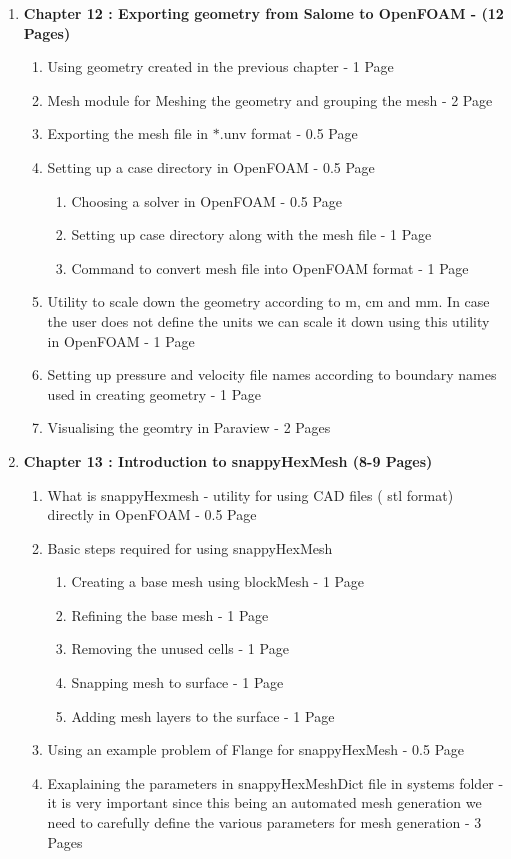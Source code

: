\documentclass[12pt]{article}
\begin{document}
\begin{enumerate}
\item \textbf{Chapter 12 : Exporting geometry from Salome to OpenFOAM - (12 Pages)}
\begin{enumerate}[label*=\arabic*.]
\item Using geometry created in the previous chapter - 1 Page 
\item Mesh module for Meshing the geometry and grouping the mesh - 2 Page
\item Exporting the mesh file in $*$.unv format - 0.5 Page
\item Setting up a case directory in OpenFOAM - 0.5 Page
\begin{enumerate}[label*=\arabic*.]
\item Choosing a solver in OpenFOAM - 0.5 Page
\item Setting up case directory along with the mesh file - 1 Page 
\item Command to convert mesh file into OpenFOAM format - 1 Page
\end{enumerate}
\item Utility to scale down the geometry according to m, cm and mm. In case the user does not define the units we can scale it down using this utility in OpenFOAM - 1 Page
\item Setting up pressure and velocity file names according to boundary names used in creating geometry - 1 Page
\item Visualising the geomtry in Paraview - 2 Pages 
\end{enumerate}

\item \textbf{Chapter 13 : Introduction to snappyHexMesh (8-9 Pages)}
\begin{enumerate}[label*=\arabic*.]
\item What is snappyHexmesh - utility for using CAD files ( stl format) directly in OpenFOAM - 0.5 Page
\item Basic steps required for using snappyHexMesh 
\begin{enumerate}[label*=\arabic*.]
\item Creating a base mesh using blockMesh - 1 Page
\item Refining the base mesh - 1 Page
\item Removing the unused cells - 1 Page
\item Snapping mesh to surface - 1 Page
\item Adding mesh layers to the surface - 1 Page
\end{enumerate}
\item Using an example problem of Flange for snappyHexMesh - 0.5 Page
\item Exaplaining the parameters in snappyHexMeshDict file in systems folder - it is very important since this being an automated mesh generation we need to carefully define the various parameters for mesh generation - 3 Pages
\end{enumerate} 


\end{enumerate}
\end{document}
